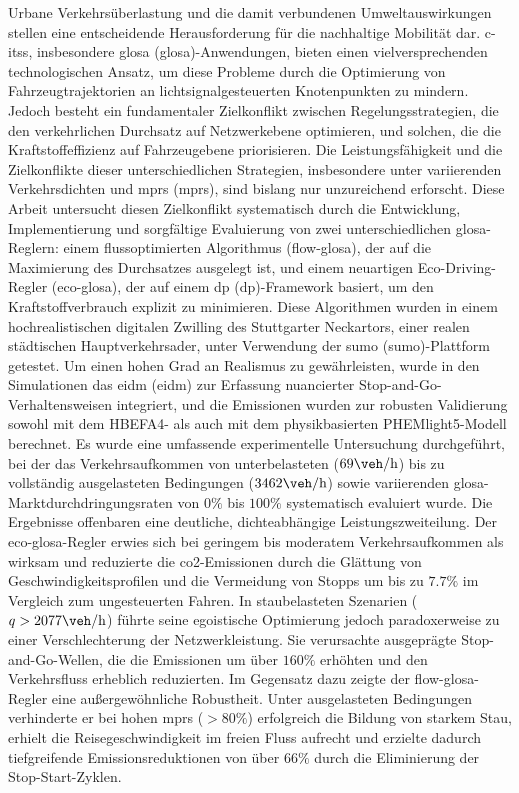 Urbane Verkehrsüberlastung und die damit verbundenen Umweltauswirkungen stellen eine entscheidende Herausforderung für die nachhaltige Mobilität dar. \acp{c-its}, insbesondere \acl{glosa} (\acs{glosa})-Anwendungen, bieten einen vielversprechenden technologischen Ansatz, um diese Probleme durch die Optimierung von Fahrzeugtrajektorien an lichtsignalgesteuerten Knotenpunkten zu mindern. Jedoch besteht ein fundamentaler Zielkonflikt zwischen Regelungsstrategien, die den verkehrlichen Durchsatz auf Netzwerkebene optimieren, und solchen, die die Kraftstoffeffizienz auf Fahrzeugebene priorisieren. Die Leistungsfähigkeit und die Zielkonflikte dieser unterschiedlichen Strategien, insbesondere unter variierenden Verkehrsdichten und \aclp{mpr} (\acs{mpr}s), sind bislang nur unzureichend erforscht.
\mynewline
Diese Arbeit untersucht diesen Zielkonflikt systematisch durch die Entwicklung, Implementierung und sorgfältige Evaluierung von zwei unterschiedlichen \ac{glosa}-Reglern: einem flussoptimierten Algorithmus (\acs{flow-glosa}), der auf die Maximierung des Durchsatzes ausgelegt ist, und einem neuartigen Eco-Driving-Regler (\ac{eco-glosa}), der auf einem \acl{dp} (\acs{dp})-Framework basiert, um den Kraftstoffverbrauch explizit zu minimieren. Diese Algorithmen wurden in einem hochrealistischen digitalen Zwilling des Stuttgarter Neckartors, einer realen städtischen Hauptverkehrsader, unter Verwendung der \acl{sumo} (\acs{sumo})-Plattform getestet. Um einen hohen Grad an Realismus zu gewährleisten, wurde in den Simulationen das \acl{eidm} (\ac{eidm}) zur Erfassung nuancierter Stop-and-Go-Verhaltensweisen integriert, und die Emissionen wurden zur robusten Validierung sowohl mit dem HBEFA4- als auch mit dem physikbasierten PHEMlight5-Modell berechnet. Es wurde eine umfassende experimentelle Untersuchung durchgeführt, bei der das Verkehrsaufkommen von unterbelasteten ($69\unit{\veh\per\hour}$) bis zu vollständig ausgelasteten Bedingungen ($3462\unit{\veh\per\hour}$) sowie variierenden \ac{glosa}-Marktdurchdringungsraten von $0\%$ bis $100\%$ systematisch evaluiert wurde.
\mynewline
Die Ergebnisse offenbaren eine deutliche, dichteabhängige Leistungszweiteilung. Der \ac{eco-glosa}-Regler erwies sich bei geringem bis moderatem Verkehrsaufkommen als wirksam und reduzierte die \ac{co2}-Emissionen durch die Glättung von Geschwindigkeitsprofilen und die Vermeidung von Stopps um bis zu $7.7\%$ im Vergleich zum ungesteuerten Fahren. In staubelasteten Szenarien ($q > 2077\unit{\veh\per\hour}$) führte seine egoistische Optimierung jedoch paradoxerweise zu einer Verschlechterung der Netzwerkleistung. Sie verursachte ausgeprägte Stop-and-Go-Wellen, die die Emissionen um über $160\%$ erhöhten und den Verkehrsfluss erheblich reduzierten. Im Gegensatz dazu zeigte der \ac{flow-glosa}-Regler eine außergewöhnliche Robustheit. Unter ausgelasteten Bedingungen verhinderte er bei hohen \acp{mpr} ($>80\%$) erfolgreich die Bildung von starkem Stau, erhielt die Reisegeschwindigkeit im freien Fluss aufrecht und erzielte dadurch tiefgreifende Emissionsreduktionen von über $66\%$ durch die Eliminierung der Stop-Start-Zyklen.
